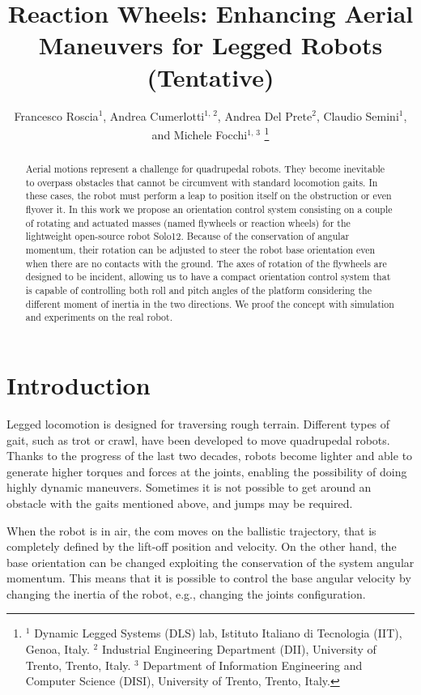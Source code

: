 \documentclass[journal,letterpaper]{IEEEtran}
\title{Reaction Wheels: Enhancing Aerial Maneuvers for
	Legged Robots (Tentative)}
\author{
	Francesco Roscia$^{1}$, Andrea Cumerlotti$^{1, \, 2}$, Andrea Del Prete$^{2}$, Claudio Semini$^{1}$, and Michele Focchi$^{1, \, 3}$
	\thanks{$^1$ Dynamic Legged Systems (DLS) lab, Istituto Italiano di Tecnologia (IIT), Genoa, Italy.
		$^2$ Industrial Engineering Department (DII), University of Trento, Trento, Italy.
		$^3$ Department of Information Engineering and Computer Science (DISI), University of Trento, Trento, Italy.
}}
\begin{document}
\maketitle
\thispagestyle{empty}
\pagestyle{empty}

\begin{abstract}%
Aerial motions represent a challenge for quadrupedal robots. They become inevitable to overpass obstacles that cannot be circumvent with standard locomotion gaits. In these cases, the robot must perform a leap to position itself on the obstruction or even flyover it. In this work we propose an orientation control system consisting on a couple of rotating and actuated masses (named flywheels or reaction wheels) for the lightweight open-source robot Solo12. Because of the conservation of angular momentum, their rotation can be adjusted to steer the robot base orientation even when there are no contacts with the ground. The axes of rotation of the flywheels are designed to be incident, allowing us to have a compact orientation control system that is capable of controlling both roll and pitch angles of the platform considering the different moment of inertia in the two directions. We proof the concept with simulation and experiments on the real robot.
\end{abstract}

\begin{IEEEkeywords}
	 
\end{IEEEkeywords}

\section{Introduction}\label{sec:introduction}
Legged locomotion is designed for traversing rough terrain.
Different types of gait, such as trot or crawl, have been developed to move quadrupedal robots. 
Thanks to the progress of the last two decades, robots become lighter and able to generate higher torques and forces at the joints, enabling the possibility of doing highly dynamic maneuvers.
Sometimes it is not possible to get around an obstacle with the gaits mentioned above, and jumps may be required. 

When the robot is in air, the \acrfull{com} moves on the ballistic trajectory, that is completely defined by the lift-off position and velocity. On the other hand, the base orientation can be changed exploiting the conservation of the system angular momentum. This means that it is possible to control the base angular velocity by changing the inertia of the robot, e.g., changing the joints configuration. 
\end{document}
